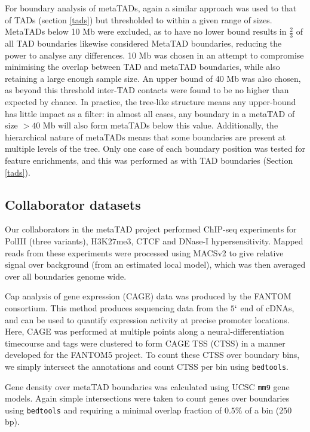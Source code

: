 \documentclass[a4paper,11pt,oneside]{book}
\begin{document}
For boundary analysis of metaTADs, again a similar approach was used to that of TADs (section \ref{tads}) but thresholded to within a given range of sizes. MetaTADs below 10 Mb were excluded, as to have no lower bound results in $\frac{2}{3}$ of all TAD boundaries likewise considered MetaTAD boundaries, reducing the power to analyse any differences. 10 Mb was chosen in an attempt to compromise minimising the overlap between TAD and metaTAD boundaries, while also retaining a large enough sample size. An upper bound of 40 Mb was also chosen, as beyond this threshold inter-TAD contacts were found to be no higher than expected by chance. In practice, the tree-like structure means any upper-bound has little impact as a filter: in almost all cases, any boundary in a metaTAD of size $> 40$ Mb will also form metaTADs below this value. Additionally, the hierarchical nature of metaTADs means that some boundaries are present at multiple levels of the tree. Only one case of each boundary position was tested for feature enrichments, and this was performed as with TAD boundaries (Section \ref{tads}).

\subsection{Collaborator datasets}\label{meth:metadata}
Our collaborators in the metaTAD project performed ChIP-seq experiments for PolIII (three variants), H$3$K$27$me$3$, CTCF and DNase-I hypersensitivity. Mapped reads from these experiments were processed using MACSv2\cite{Zhang2008} to give relative signal over background (from an estimated local model), which was then averaged over all boundaries genome wide. 

Cap analysis of gene expression (CAGE) data was produced by the FANTOM consortium.\cite{fantom5, itoh2012a} This method produces sequencing data from the $5`$ end of cDNAs, and can be used to quantify expression activity at precise promoter locations.\cite{Kodzius2006} Here, CAGE was performed at multiple points along a neural-differentiation timecourse and tags were clustered to form CAGE TSS (CTSS) in a manner developed for the FANTOM5 project.\cite{fantom5} To count these CTSS over boundary bins, we simply intersect the annotations and count CTSS per bin using \texttt{bedtools}.\cite{Quinlan2010}

Gene density over metaTAD boundaries was calculated using UCSC \texttt{mm9} gene models.\cite{Karolchik2014} Again simple intersections were taken to count genes over boundaries using \texttt{bedtools}\cite{Quinlan2010} and requiring a minimal overlap fraction of $0.5\%$ of a bin ($250$ bp).
\end{document}
